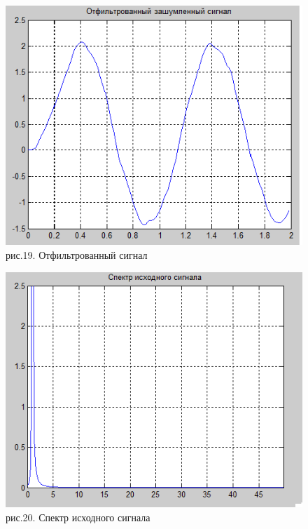 \documentclass[10pt,a4paper]{report}
\begin{document}
\begin{figure}
\begin{center}
\includegraphics[angle=0, scale = 0.9]{6_3.png}\newline
рис.19. Отфильтрованный сигнал\newline
\end{center}
\end{figure}
\begin{figure}
\begin{center}
\includegraphics[angle=0, scale = 0.9]{6_4.png}\newline
рис.20. Спектр исходного сигнала\newline
\end{center}
\end{figure}
\end{document}
